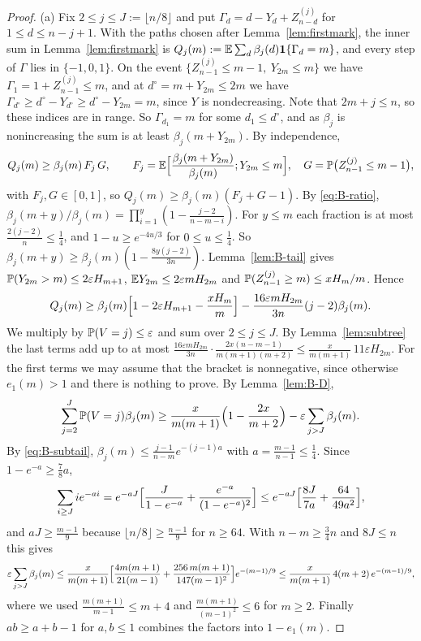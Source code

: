 \begin{proof}
(a) Fix $2\le j\le J:=\lfloor n/8\rfloor$ and put
$\Gamma_d=d-Y_d+Z^{(j)}_{n-d}$ for $1\le d\le n-j+1$. With the paths chosen
after Lemma~\ref{lem:firstmark}, the inner sum in Lemma~\ref{lem:firstmark}
is $Q_j(m):=\mathbb{E}\sum_d\beta_j(d)\mathbf 1\{\Gamma_d=m\}$, and every step of
$\Gamma$ lies in $\{-1,0,1\}$. On the event
$\{Z^{(j)}_{n-1}\le m-1,\ Y_{2m}\le m\}$ we have
$\Gamma_1=1+Z^{(j)}_{n-1}\le m$, and at $d^\circ=m+Y_{2m}\le2m$ we have
$\Gamma_{d^\circ}\ge d^\circ-Y_{d^\circ}\ge d^\circ-Y_{2m}=m$, since $Y$ is
nondecreasing. Note that $2m+j\le n$, so these
indices are in range. So $\Gamma_{d_1}=m$ for some $d_1\le d^\circ$, and as
$\beta_j$ is nonincreasing the sum is at least $\beta_j(m+Y_{2m})$. By
independence,
\[
 Q_j(m)\ge\beta_j(m)\,F_j\,G,\qquad
 F_j=\mathbb{E}\Bigl[\frac{\beta_j(m+Y_{2m})}{\beta_j(m)};Y_{2m}\le m\Bigr],\quad
 G=\mathbb{P}\bigl(Z^{(j)}_{n-1}\le m-1\bigr),
\]
with $F_j,G\in[0,1]$, so $Q_j(m)\ge\beta_j(m)(F_j+G-1)$. By
\eqref{eq:B-ratio}, $\beta_j(m+y)/\beta_j(m)=\prod_{i=1}^y(1-\frac{j-2}{n-m-i})$.
For $y\le m$ each fraction is at most $\frac{2(j-2)}n\le\frac14$, and
$1-u\ge e^{-4u/3}$ for $0\le u\le\frac14$. So
$\beta_j(m+y)\ge\beta_j(m)(1-\frac{8y(j-2)}{3n})$. Lemma~\ref{lem:B-tail}
gives $\mathbb{P}(Y_{2m}>m)\le2\varepsilon H_{m+1}$, $\mathbb{E} Y_{2m}\le2\varepsilon mH_{2m}$ and
$\mathbb{P}(Z^{(j)}_{n-1}\ge m)\le xH_m/m$. Hence
\[
 Q_j(m)\ge\beta_j(m)\Bigl[1-2\varepsilon H_{m+1}-\frac{xH_m}m\Bigr]
 -\frac{16\varepsilon mH_{2m}}{3n}(j-2)\beta_j(m).
\]
We multiply by $\mathbb{P}(V=j)\le\varepsilon$ and sum over $2\le j\le J$. By
Lemma~\ref{lem:subtree} the last terms add up to at most
$\frac{16\varepsilon mH_{2m}}{3n}\cdot\frac{2x(n-m-1)}{m(m+1)(m+2)}\le\frac{x}{m(m+1)}\,11\varepsilon H_{2m}$.
For the first terms we may assume that the bracket is nonnegative, since
otherwise $e_1(m)>1$ and there is nothing to prove. By Lemma~\ref{lem:B-D},
\[
 \sum_{j=2}^J\mathbb{P}(V=j)\beta_j(m)\ge\frac{x}{m(m+1)}\Bigl(1-\frac{2x}{m+2}\Bigr)
 -\varepsilon\sum_{j>J}\beta_j(m).
\]
By \eqref{eq:B-subtail}, $\beta_j(m)\le\frac{j-1}{n-m}e^{-(j-1)a}$ with
$a=\frac{m-1}{n-1}\le\frac14$. Since $1-e^{-a}\ge\frac78a$,
\[
 \sum_{i\ge J}ie^{-ai}=e^{-aJ}\Bigl[\frac J{1-e^{-a}}+\frac{e^{-a}}{(1-e^{-a})^2}\Bigr]
 \le e^{-aJ}\Bigl[\frac{8J}{7a}+\frac{64}{49a^2}\Bigr],
\]
and $aJ\ge\frac{m-1}9$ because $\lfloor n/8\rfloor\ge\frac{n-1}9$ for $n\ge64$.
With $n-m\ge\frac34n$ and $8J\le n$ this gives
\[
 \varepsilon\sum_{j>J}\beta_j(m)\le\frac{x}{m(m+1)}
 \Bigl[\frac{4m(m+1)}{21(m-1)}+\frac{256\,m(m+1)}{147(m-1)^2}\Bigr]e^{-(m-1)/9}
 \le\frac{x}{m(m+1)}\,4(m+2)\,e^{-(m-1)/9},
\]
where we used $\frac{m(m+1)}{m-1}\le m+4$ and $\frac{m(m+1)}{(m-1)^2}\le6$ for
$m\ge2$. Finally $ab\ge a+b-1$ for $a,b\le1$ combines the factors into
$1-e_1(m)$.


\end{proof}
